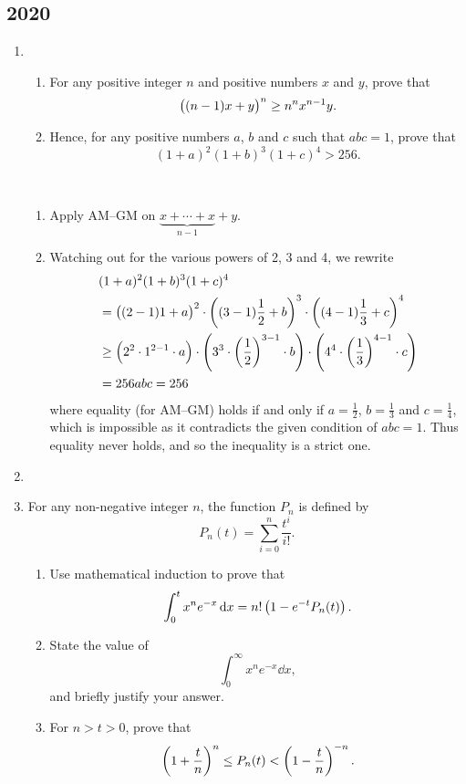 \subsection*{2020}
\begin{enumerate}
\item \begin{enumerate}[label=(\roman*)]
\item For any positive integer $n$ and positive numbers $x$ and $y$, prove that
\[ \left((n-1)x+y\right)^n\ge n^nx^{n-1}y. \]
\item Hence, for any positive numbers $a$, $b$ and $c$ such that $abc=1$, prove that
\[ (1+a)^2(1+b)^3(1+c)^4>256. \]
\end{enumerate}

\begin{solution} \
\begin{enumerate}[label=(\roman*)]
\item Apply AM--GM on $\underbrace{x+\cdots+x}_{n-1}+y$.

\item Watching out for the various powers of 2, 3 and 4, we rewrite
\begin{align*}
&(1+a)^2(1+b)^3(1+c)^4\\
&=\left((2-1)1+a\right)^2\cdot\left((3-1)\frac{1}{2}+b\right)^3\cdot\left((4-1)\frac{1}{3}+c\right)^4\\
&\ge\left(2^2\cdot1^{2-1}\cdot a\right)\cdot\left(3^3\cdot\left(\frac{1}{2}\right)^{3-1}\cdot b\right)\cdot\left(4^4\cdot\left(\frac{1}{3}\right)^{4-1}\cdot c\right)\\
&=256abc=256
\end{align*}
where equality (for AM--GM) holds if and only if $a=\frac{1}{2}$, $b=\frac{1}{3}$ and $c=\frac{1}{4}$, which is impossible as it contradicts the given condition of $abc=1$. Thus equality never holds, and so the inequality is a strict one.
\end{enumerate}
\end{solution}

\item 

\item For any non-negative integer $n$, the function $P_n$ is defined by
\[ P_n(t)=\sum_{i=0}^n\frac{t^i}{i!}. \]
\begin{enumerate}[label=(\roman*)]
\item Use mathematical induction to prove that
\[ \int_0^tx^ne^{-x}\dd{x}=n!\left(1-e^{-t}P_n(t)\right). \]
\item State the value of 
\[ \int_0^\infty x^ne^{-x}\dd{x}, \]
and briefly justify your answer.
\item For $n>t>0$, prove that
\[ \left(1+\frac{t}{n}\right)^n\le P_n(t)<\left(1-\frac{t}{n}\right)^{-n}. \]
\end{enumerate}


\end{enumerate}
